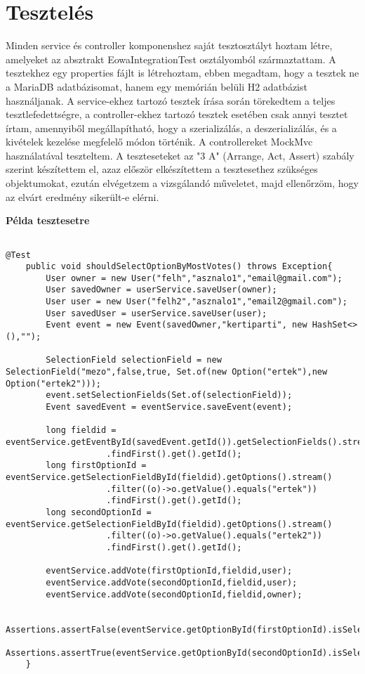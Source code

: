 \documentclass[a4paper,12pt]{report}
\theoremstyle{definition}
\theoremstyle{remark}
\begin{document}
\section{Tesztelés}

Minden service és controller komponenshez saját tesztosztályt hoztam létre, amelyeket az absztrakt EowaIntegrationTest osztályomból származtattam.  A tesztekhez egy properties fájlt is létrehoztam, ebben megadtam, hogy a tesztek ne a MariaDB adatbázisomat, hanem egy memórián belüli H2 adatbázist használjanak. A service-ekhez tartozó tesztek írása során törekedtem a teljes tesztlefedettségre, a controller-ekhez tartozó tesztek esetében csak annyi tesztet írtam, amennyiből megállapítható, hogy a szerializálás, a deszerializálás, és a kivételek kezelése megfelelő módon történik. A controllereket MockMvc használatával teszteltem. A teszteseteket az "3 A" (Arrange, Act, Assert) szabály szerint készítettem el, azaz először elkészítettem a tesztesethez szükséges objektumokat, ezután elvégetzem a vizsgálandó műveletet, majd ellenőrzöm, hogy az elvárt eredmény sikerült-e elérni.

\newpage
{\Huge \bf Példa tesztesetre}
\begin{lstlisting}

@Test
    public void shouldSelectOptionByMostVotes() throws Exception{
        User owner = new User("felh","asznalo1","email@gmail.com");
        User savedOwner = userService.saveUser(owner);
        User user = new User("felh2","asznalo1","email2@gmail.com");
        User savedUser = userService.saveUser(user);
        Event event = new Event(savedOwner,"kertiparti", new HashSet<>(),"");

        SelectionField selectionField = new SelectionField("mezo",false,true, Set.of(new Option("ertek"),new Option("ertek2")));
        event.setSelectionFields(Set.of(selectionField));
        Event savedEvent = eventService.saveEvent(event);

        long fieldid = eventService.getEventById(savedEvent.getId()).getSelectionFields().stream()
					.findFirst().get().getId();
        long firstOptionId = eventService.getSelectionFieldById(fieldid).getOptions().stream()
					.filter((o)->o.getValue().equals("ertek"))
					.findFirst().get().getId();
        long secondOptionId = eventService.getSelectionFieldById(fieldid).getOptions().stream()
					.filter((o)->o.getValue().equals("ertek2"))
					.findFirst().get().getId();

        eventService.addVote(firstOptionId,fieldid,user);
        eventService.addVote(secondOptionId,fieldid,user);
        eventService.addVote(secondOptionId,fieldid,owner);

        Assertions.assertFalse(eventService.getOptionById(firstOptionId).isSelected());
        Assertions.assertTrue(eventService.getOptionById(secondOptionId).isSelected());
    }

\end{lstlisting}
\end{document}
